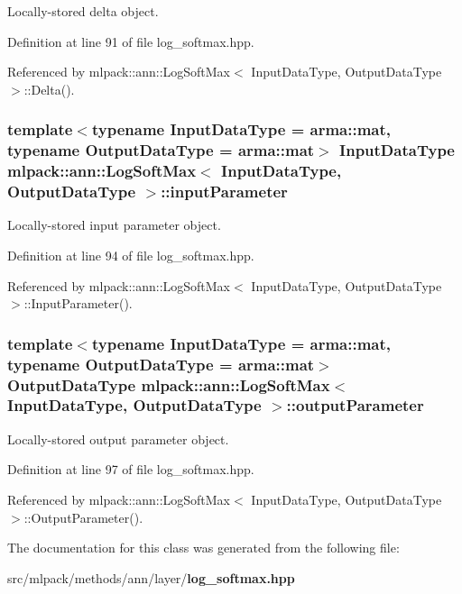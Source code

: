 Locally-\/stored delta object. 



Definition at line 91 of file log\+\_\+softmax.\+hpp.



Referenced by mlpack\+::ann\+::\+Log\+Soft\+Max$<$ Input\+Data\+Type, Output\+Data\+Type $>$\+::\+Delta().

\subsubsection[{input\+Parameter}]{\setlength{\rightskip}{0pt plus 5cm}template$<$typename Input\+Data\+Type  = arma\+::mat, typename Output\+Data\+Type  = arma\+::mat$>$ Input\+Data\+Type {\bf mlpack\+::ann\+::\+Log\+Soft\+Max}$<$ Input\+Data\+Type, Output\+Data\+Type $>$\+::input\+Parameter\hspace{0.3cm}{\ttfamily [private]}}\label{classmlpack_1_1ann_1_1LogSoftMax_abda926e64cebd8d88caa9f945bd27f84}


Locally-\/stored input parameter object. 



Definition at line 94 of file log\+\_\+softmax.\+hpp.



Referenced by mlpack\+::ann\+::\+Log\+Soft\+Max$<$ Input\+Data\+Type, Output\+Data\+Type $>$\+::\+Input\+Parameter().

\subsubsection[{output\+Parameter}]{\setlength{\rightskip}{0pt plus 5cm}template$<$typename Input\+Data\+Type  = arma\+::mat, typename Output\+Data\+Type  = arma\+::mat$>$ Output\+Data\+Type {\bf mlpack\+::ann\+::\+Log\+Soft\+Max}$<$ Input\+Data\+Type, Output\+Data\+Type $>$\+::output\+Parameter\hspace{0.3cm}{\ttfamily [private]}}\label{classmlpack_1_1ann_1_1LogSoftMax_ac5aaf6ccc0724f05114a7a2fe2890d99}


Locally-\/stored output parameter object. 



Definition at line 97 of file log\+\_\+softmax.\+hpp.



Referenced by mlpack\+::ann\+::\+Log\+Soft\+Max$<$ Input\+Data\+Type, Output\+Data\+Type $>$\+::\+Output\+Parameter().



The documentation for this class was generated from the following file\+:\begin{DoxyCompactItemize}
\item 
src/mlpack/methods/ann/layer/{\bf log\+\_\+softmax.\+hpp}\end{DoxyCompactItemize}

